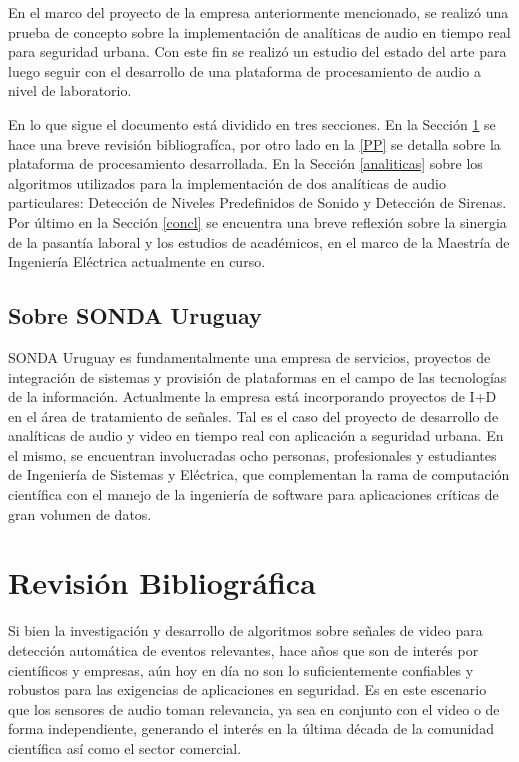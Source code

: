 \documentclass{article}
\begin{document}
\bigskip
En el marco del proyecto de la empresa anteriormente mencionado, se realizó una prueba de concepto sobre la implementación de analíticas de audio en tiempo real para seguridad urbana. Con este fin se realizó un estudio del estado del arte para luego seguir con el desarrollo de una plataforma de procesamiento de audio a nivel de laboratorio. 

\bigskip
En lo que sigue el documento está dividido en tres secciones. En la Sección \ref{literatura} se hace una breve revisión bibliografíca, por otro lado en la \ref{PP} se detalla sobre la plataforma de procesamiento desarrollada. En la Sección \ref{analiticas} sobre los algoritmos utilizados para la implementación de dos analíticas de audio particulares: Detección de Niveles Predefinidos de Sonido y Detección de Sirenas. Por último en la Sección \ref{concl} se encuentra una breve reflexión sobre la sinergia de la pasantía laboral y los estudios de académicos, en el marco de la Maestría de Ingeniería Eléctrica actualmente en curso.  

\subsection{Sobre SONDA Uruguay}
SONDA Uruguay es fundamentalmente una empresa de servicios, proyectos de integración de sistemas y provisión de plataformas en el campo de las tecnologías de la información. Actualmente la empresa está incorporando proyectos de I+D en el área de tratamiento de señales. Tal es el caso del proyecto de desarrollo de analíticas de audio y video en tiempo real con aplicación a seguridad urbana. En el mismo, se encuentran involucradas ocho personas, profesionales y estudiantes de Ingeniería de Sistemas y Eléctrica, que complementan la rama de computación científica con el manejo de la ingeniería de software para aplicaciones críticas de gran volumen de datos.  


\section{Revisión Bibliográfica}
\label{literatura}
Si bien la investigación y desarrollo de algoritmos sobre señales de video para detección automática de eventos relevantes, hace años que son de interés por científicos y empresas, aún hoy en día no son lo suficientemente confiables y robustos para las exigencias de aplicaciones en seguridad. Es en este escenario que los sensores de audio toman relevancia, ya sea en conjunto con el video o de forma independiente, generando el interés en la última década de la comunidad científica así como el sector comercial. 
\end{document}
